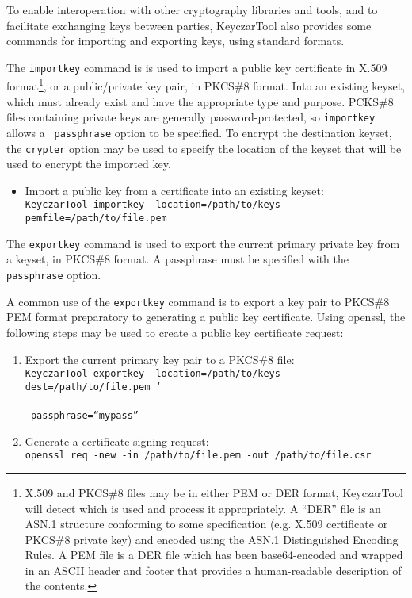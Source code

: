 \documentclass{llncs}
\begin{document}
To enable interoperation with other cryptography libraries and tools,
and to facilitate exchanging keys between parties, KeyczarTool also
provides some commands for importing and exporting keys, using
standard formats.

The {\tt importkey} command is is used to import a public key
certificate in X.509 format\footnote{X.509 and PKCS\#8 files may be in
either PEM or DER format, KeyczarTool will detect which is used and
process it appropriately.  A ``DER'' file is an ASN.1 structure
conforming to some specification (e.g. X.509 certificate or PKCS\#8
private key) and encoded using the ASN.1 Distinguished Encoding
Rules.  A PEM file is a DER file which has been base64-encoded and
wrapped in an ASCII header and footer that provides a human-readable
description of the contents.}, or a public/private key pair,
in PKCS\#8 format. Into an existing keyset, which must already exist
and have the appropriate type and purpose.  PCKS\#8 files containing private keys are
generally password-protected, so {\tt importkey} allows a {\tt
passphrase} option to be specified.  To encrypt the destination
keyset, the {\tt crypter} option may be used to specify the location
of the keyset that will be used to encrypt the imported key.

\begin{itemize}
\item Import a public key from a certificate into an existing keyset:\\
{\tt KeyczarTool importkey --location=/path/to/keys --pemfile=/path/to/file.pem}
\end{itemize}

The {\tt exportkey} command is used to export the current primary
private key from a keyset, in PKCS\#8 format.  A passphrase must be
specified with the {\tt passphrase} option.

A common use of the {\tt exportkey} command is to export a key pair to
PKCS\#8 PEM format preparatory to generating a public key certificate.
Using openssl, the following steps may be used to create a public key
certificate request:

\begin{enumerate}
  \item Export the current primary key pair to a PKCS\#8 file:\\
    {\tt KeyczarTool exportkey --location=/path/to/keys  
      --dest=/path/to/file.pem \texttt{\char`\\} \\
      --passphrase=``mypass''}
  \item Generate a certificate signing request:\\
    {\tt openssl req -new -in /path/to/file.pem -out /path/to/file.csr}
\end{enumerate}
\end{document}
